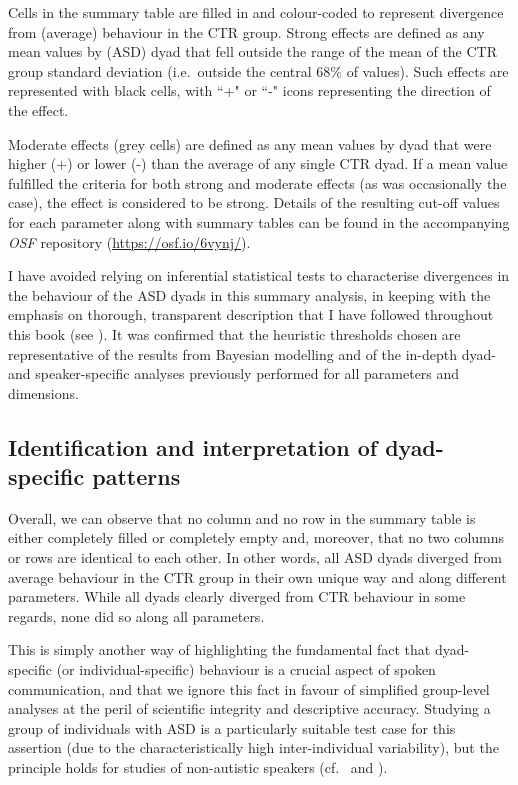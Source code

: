 Cells in the summary table are filled in and colour-coded to represent divergence from (average) behaviour in the CTR group. Strong effects are defined as any mean values by (ASD) dyad that fell outside the range of the mean of the CTR group  standard deviation (i.e.~outside the central 68\% of values). Such effects are represented with black cells, with ``+" or ``-" icons representing the direction of the effect.

Moderate effects (grey cells) are defined as any mean values by dyad that were higher (+) or lower (-) than the average of any single CTR dyad. If a mean value fulfilled the criteria for both strong and moderate effects (as was occasionally the case), the effect is considered to be strong. Details of the resulting cut-off values for each parameter along with summary tables can be found in the accompanying \textit{OSF} repository (\url{https://osf.io/6vynj/}).

\hspace*{-1pt}I have avoided relying on inferential statistical tests to characterise divergences in the behaviour of the ASD dyads in this summary analysis, in keeping with the emphasis on thorough, transparent description that I have followed throughout this book (see ). It was confirmed that the heuristic thresholds chosen are representative of the results from Bayesian modelling and of the in-depth dyad- and speaker-specific analyses previously performed for all parameters and dimensions.

\subsection{Identification and interpretation of dyad-specific patterns}\label{Conclusion_SummaryAnalysis_patterns}

Overall, we can observe that no column and no row in the summary table is either completely filled or completely empty and, moreover, that no two columns or rows are identical to each other. In other words, all ASD dyads diverged from average behaviour in the CTR group in their own unique way and along different parameters. While all dyads clearly diverged from CTR behaviour in some regards, none did so along all parameters.

This is simply another way of highlighting the fundamental fact that dyad-specific (or individual-specific) behaviour is a crucial aspect of spoken communication, and that we ignore this fact in favour of simplified group-level analyses at the peril of scientific integrity and descriptive accuracy. Studying a group of individuals with ASD is a particularly suitable test case for this assertion (due to the characteristically high inter-individual variability), but the principle holds for studies of non-autistic speakers (cf.~ and ).

